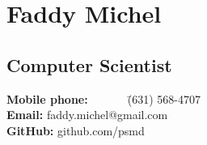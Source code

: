 \section{Faddy Michel}
\subsection{Computer Scientist}
\begin{tabbing}
 \textbf{Mobile phone:}\ \ \ \ \ \ \ \= (631) 568-4707\\
 \textbf{Email:} \> faddy.michel@gmail.com\\
 \textbf{GitHub:} \> github.com/psmd
\end{tabbing}
